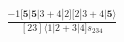\documentclass[varwidth, border=5pt]{standalone}
\begin{document}
\begin{my}
$\begin{gathered}
\scriptscriptstyle\frac{-1[𝟓|𝟓|3+4|2][2|3+4|𝟓⟩}{[23]⟨1|2+3|4]s_{234}}
\end{gathered}$
\end{my}
\end{document}
